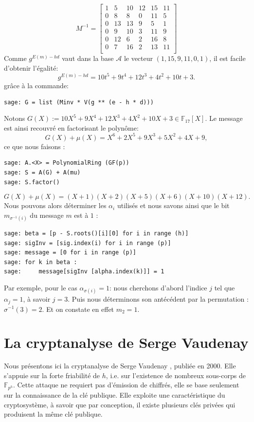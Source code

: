 \documentclass[a4paper, titlepage, 11pt]{article}
\theoremstyle{definition}
\theoremstyle{remark}
\def\gf #1{\mathbb{F}_{#1}}
\begin{document}
$$M^{-1} = \left[\begin{array}{cccccc}
1 & 5 & 10 & 12 & 15 & 11 \\
0 & 8 & 8 & 0 & 11 & 5 \\
0 & 13 & 13 & 9 & 5 & 1 \\
0 & 9 & 10 & 3 & 11 & 9 \\
0 & 12 & 6 & 2 & 16 & 8 \\
0 & 7 & 16 & 2 & 13 & 11 \\
\end{array}\right]$$
Comme $g^{E(m) - hd}$ vaut dans la base $\mathcal{A}$ le vecteur $(1, 15, 9, 11, 0, 1)$, il est facile d'obtenir l'égalité:
$$g^{E(m) - hd} = 10t^5 + 9t^4 + 12t^3 + 4t^2 + 10t + 3.$$
grâce à la commande:
\begin{verbatim}
sage: G = list (Minv * V(g ** (e - h * d)))
\end{verbatim}
Notons $G(X) := 10X^5 + 9X^4 + 12X^3 + 4X^2 + 10X + 3 \in \gf{17}[X]$. Le message est ainsi recouvré en factorisant le polynôme:
$$G(X) + \mu(X) = X^6 + 2X^5 + 9X^3 + 5X^2 + 4X + 9,$$
ce que nous faisons :
\begin{verbatim}
sage: A.<X> = PolynomialRing (GF(p))
sage: S = A(G) + A(mu)
sage: S.factor()
\end{verbatim}
$$G(X) + \mu(X) = (X + 1)(X + 2)(X + 5)(X + 6)(X + 10)(X + 12).$$
Nous pouvons alors déterminer les $\alpha_i$ utilisés et nous savons ainsi que le bit $m_{\sigma^{-1}(i)}$ du message $m$ est à $1$ :
\begin{verbatim}
sage: beta = [p - S.roots()[i][0] for i in range (h)]
sage: sigInv = [sig.index(i) for i in range (p)]
sage: message = [0 for i in range (p)]
sage: for k in beta :
sage:     message[sigInv [alpha.index(k)]] = 1
\end{verbatim}
Par exemple, pour le cas $\alpha_{\sigma(i)} = 1$: nous cherchons d'abord l'indice $j$ tel que $\alpha_j = 1$, à savoir $j = 3$. Puis nous déterminons son antécédent par la permutation : $\sigma^{-1}(3) = 2$. Et on constate en effet $m_2 = 1$.

\section{La cryptanalyse de Serge Vaudenay}\label{sec:cryptanalyse}

Nous présentons ici la cryptanalyse de Serge Vaudenay \cite{vaudenay2000}, publiée en 2000. Elle s'appuie sur la forte friabilité de $h$, i.e. sur l'existence de nombreux sous-corps de $\gf{p^h}$. Cette attaque ne requiert pas d'émission de chiffrés, elle se base seulement sur la connaissance de la clé publique. Elle exploite une caractéristique du cryptosystème, à savoir que par conception, il existe plusieurs clés privées qui produisent la même clé publique.
\end{document}
